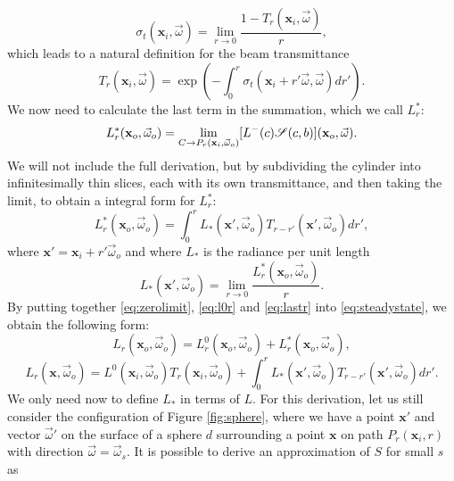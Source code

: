 \begin{equation*}
\sigma_t(\mathbf{x}_i, \vec{\omega}) = \lim_{r\rightarrow 0} \frac{1 - T_r(\mathbf{x}_i, \vec{\omega})}{r},
\end{equation*}
which leads to a natural definition for the beam transmittance
\begin{equation*}
T_r(\mathbf{x}_i, \vec{\omega}) = \exp\left(-\int_0^r \sigma_t(\mathbf{x}_i + r' \vec{\omega}, \vec{\omega}) dr'\right).
\end{equation*}
We now need to calculate the last term in the summation, which we call $L_r^*$:
\begin{equation*}
L_r^*(\mathbf{x}_o, \vec{\omega}_o) = \lim_{C\rightarrow P_r(\mathbf{x}_i,\vec{\omega}_o)} [L^-(c)\mathscr{S}(c,b)] (\mathbf{x}_o, \vec{\omega}).
\end{equation*}
We will not include the full derivation, but by subdividing the cylinder into infinitesimally thin slices, each with its own transmittance, and then taking the limit, to obtain a integral form for $L_r^*$:
\begin{equation}
\label{eq:lastr}
L_r^*(\mathbf{x}_o, \vec{\omega}_o) = \int_0^r L_*(\mathbf{x}', \vec{\omega}_o) T_{r-r'}(\mathbf{x}', \vec{\omega}_o)  dr',
\end{equation}
where $\mathbf{x}' = \mathbf{x}_i + r' \vec{\omega}_o$ and where $L_*$ is the radiance per unit length
\begin{equation*}
L_*(\mathbf{x}', \vec{\omega}_o) = \lim_{r \rightarrow 0} \frac{L_r^*(\mathbf{x}_o, \vec{\omega}_o)}{r}.
\end{equation*}
By putting together \ref{eq:zerolimit}, \ref{eq:l0r} and \ref{eq:lastr} into \ref{eq:steadystate}, we obtain the following form:
\begin{equation}
\label{eq:fullformintegralpacked}
L_r(\mathbf{x}_o, \vec{\omega}_o) = L_r^0(\mathbf{x}_o, \vec{\omega}_o) + L_r^*(\mathbf{x}_o, \vec{\omega}_o),
\end{equation}
\begin{equation*}
L_r(\mathbf{x}, \vec{\omega}_o) =  L^0(\mathbf{x}_i, \vec{\omega}_o) T_r(\mathbf{x}_i, \vec{\omega}_o) + \int_0^r L_*(\mathbf{x}', \vec{\omega}_o) T_{r-r'}(\mathbf{x}', \vec{\omega}_o)  dr'.
\end{equation*}
We only need now to define $L_*$ in terms of $L$. For this derivation, let us still consider the configuration of Figure \ref{fig:sphere}, where we have a point $\mathbf{x}'$ and vector $\vec{\omega}'$ on the surface of a sphere $d$ surrounding a point $\mathbf{x}$ on path $P_r(\mathbf{x}_i,r)$ with direction $\vec{\omega} = \vec{\omega}_s$. It is possible to derive an approximation of $S$ for small $s$ as
